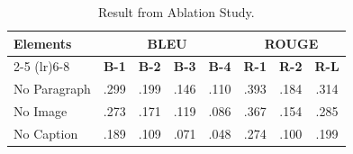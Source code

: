 \begin{table}[t]
\centering
\footnotesize
\renewcommand{\arraystretch}{1.2}
\setlength{\tabcolsep}{2pt}
\begin{tabular}{lccccccc}
\toprule
\multirow{2}{*}{\textbf{Elements}} & \multicolumn{4}{c}{\textbf{BLEU}} & \multicolumn{3}{c}{\textbf{ROUGE}} \\ 
\cmidrule(lr){2-5} \cmidrule(lr){6-8}
 & \textbf{B-1} & \textbf{B-2} & \textbf{B-3} & \textbf{B-4} & \textbf{R-1} & \textbf{R-2} & \textbf{R-L} \\ 
\midrule
No Paragraph & .299 & .199 & .146 & .110 & .393 & .184 & .314 \\ 
\midrule
No Image & .273 & .171 & .119 & .086 & .367 & .154 & .285 \\ 
\midrule
No Caption & .189 & .109 & .071 & .048 & .274 & .100 & .199 \\ 
\bottomrule
\end{tabular}
\caption{Result from Ablation Study.}
\label{tab:ablation-study-full}
\end{table}
